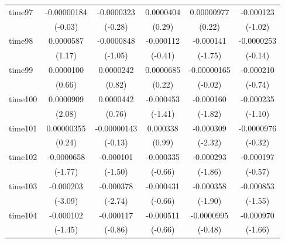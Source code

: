 \begin{table}[htbp]
\begin{tabular}{l*{5}{c}}
time97      & -0.00000184         &  -0.0000323         &   0.0000404         &  0.00000977         &   -0.000123         \\
            &     (-0.03)         &     (-0.28)         &      (0.29)         &      (0.22)         &     (-1.02)         \\
time98      &   0.0000587         &  -0.0000848         &   -0.000112         &   -0.000141         &  -0.0000253         \\
            &      (1.17)         &     (-1.05)         &     (-0.41)         &     (-1.75)         &     (-0.14)         \\
time99      &   0.0000100         &   0.0000242         &   0.0000685         & -0.00000165         &   -0.000210         \\
            &      (0.66)         &      (0.82)         &      (0.22)         &     (-0.02)         &     (-0.74)         \\
time100     &   0.0000909\sym{*}  &   0.0000442         &   -0.000453         &   -0.000160         &   -0.000235         \\
            &      (2.08)         &      (0.76)         &     (-1.41)         &     (-1.82)         &     (-1.10)         \\
time101     &  0.00000355         & -0.00000143         &    0.000338         &   -0.000309\sym{*}  &  -0.0000976         \\
            &      (0.24)         &     (-0.13)         &      (0.99)         &     (-2.32)         &     (-0.32)         \\
time102     &  -0.0000658         &   -0.000101         &   -0.000335         &   -0.000293         &   -0.000197         \\
            &     (-1.77)         &     (-1.50)         &     (-0.66)         &     (-1.86)         &     (-0.57)         \\
time103     &   -0.000203\sym{**} &   -0.000378\sym{**} &   -0.000431         &   -0.000358         &   -0.000853         \\
            &     (-3.09)         &     (-2.74)         &     (-0.66)         &     (-1.90)         &     (-1.55)         \\
time104     &   -0.000102         &   -0.000117         &   -0.000511         &  -0.0000995         &   -0.000970         \\
            &     (-1.45)         &     (-0.86)         &     (-0.66)         &     (-0.48)         &     (-1.66)         \\

\end{tabular}
\end{table}
